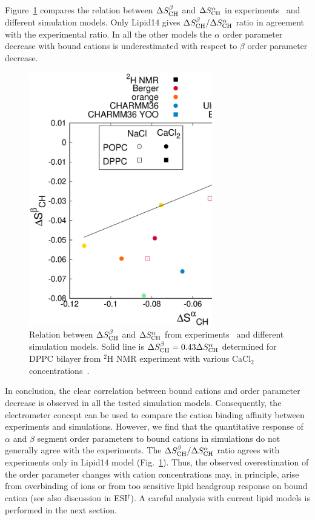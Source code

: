 \documentclass[twoside,twocolumn,9pt]{article}
\begin{document}
Figure~\ref{AvsB} compares the relation between $\Delta S_{\rm{CH}}^{\beta}$ and $\Delta S_{\rm{CH}}^{\alpha}$
in experiments~\cite{akutsu81} and different simulation models.
Only Lipid14 gives $\Delta S_{\rm{CH}}^{\beta}/\Delta S_{\rm{CH}}^{\alpha}$ ratio in agreement with the experimental ratio.
In all the other models the $\alpha$ order parameter decrease with bound cations is underestimated with
respect to $\beta$ order parameter decrease.
\begin{figure}[t]
  \centering
  \includegraphics[width=8cm]{../Fig/OrderParameterAvsB.eps}
  \caption{\label{AvsB}
    Relation between $\Delta S_{\rm{CH}}^{\beta}$ and $\Delta S_{\rm{CH}}^{\alpha}$ from experiments~\cite{akutsu81} and
    different simulation models. Solid line is $\Delta S_{\rm{CH}}^{\beta}=0.43\Delta S_{\rm{CH}}^{\alpha}$ determined for DPPC bilayer
    from $^2$H NMR experiment with various CaCl$_2$ concentrations~\cite{akutsu81}.
  }
\end{figure}




In conclusion, the clear correlation between bound cations and order parameter decrease 
is observed in all the tested simulation models. Consequently, the electrometer concept can 
be used to compare the cation binding affinity between experiments and simulations. 
However, we find that the quantitative response of $\alpha$ and $\beta$ segment order parameters to bound cations in simulations 
do not generally agree with the experiments. The $\Delta S_{\rm{CH}}^{\beta}/\Delta S_{\rm{CH}}^{\alpha}$ ratio  
agrees with experiments only in Lipid14 model (Fig.~\ref{AvsB}). 
Thus, the observed overestimation of the order parameter changes with cation concentrations may, in principle, arise
from overbinding of ions or from too sensitive lipid headgroup response on bound cation 
(see also discussion in ESI$^\dag$). 
A careful analysis with current lipid models is performed in the next section.
\end{document}
